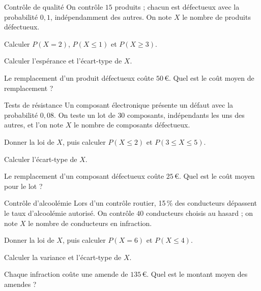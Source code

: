 
\begin{exercice}[2]{Contrôle de qualité}
On contrôle $15$ produits ; chacun est défectueux avec la probabilité $0{,}1$, indépendamment des autres. On note $X$ le nombre
de produits défectueux.
\begin{questions}
  \item Calculer $P(X=2)$, $P(X\leq1)$ et $P(X\geq3)$.
  \item Calculer l'espérance et l'écart-type de $X$.
  \item Le remplacement d'un produit défectueux coûte $50$\,€. Quel est le coût moyen de remplacement ?
\end{questions}
\end{exercice}

\begin{exercice}[2]{Tests de résistance}
Un composant électronique présente un défaut avec la probabilité $0{,}08$. On teste un lot de $30$ composants, indépendants les uns
des autres, et l'on note $X$ le nombre de composants défectueux.
\begin{questions}
  \item Donner la loi de $X$, puis calculer $P(X\leq2)$ et $P(3\leq X\leq5)$.
  \item Calculer l'écart-type de $X$.
  \item Le remplacement d'un composant défectueux coûte $25$\,€. Quel est le coût moyen pour le lot ?
\end{questions}
\end{exercice}

\begin{exercice}[2]{Contrôle d'alcoolémie}
Lors d'un contrôle routier, 15\,\% des conducteurs dépassent le taux d'alcoolémie autorisé. On contrôle $40$ conducteurs choisis
au hasard ; on note $X$ le nombre de conducteurs en infraction.
\begin{questions}
  \item Donner la loi de $X$, puis calculer $P(X=6)$ et $P(X\leq4)$.
  \item Calculer la variance et l'écart-type de $X$.
  \item Chaque infraction coûte une amende de $135$\,€. Quel est le montant moyen des amendes ?
\end{questions}
\end{exercice}

